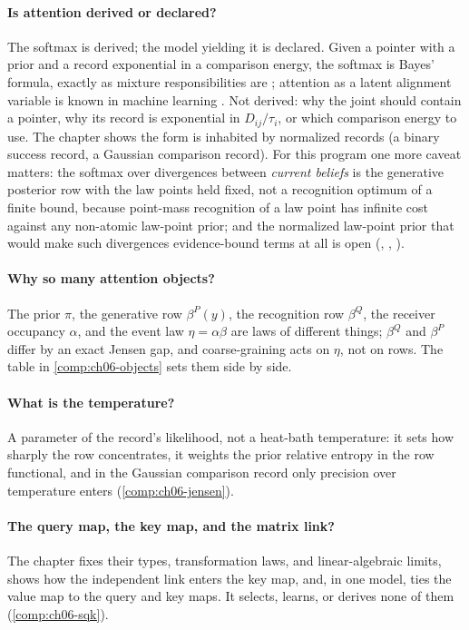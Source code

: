 \paragraph{Is attention derived or declared?}
The softmax is derived; the model yielding it is declared. Given a pointer with a prior and a record exponential
in a comparison energy, the softmax is Bayes' formula, exactly as mixture responsibilities are \citep{Bishop2006};
attention as a latent alignment variable is known in machine learning \citep{Deng2018LatentAlignment}. Not derived:
why the joint should contain a pointer, why its record is exponential in $D_{ij}/\tau_i$, or which comparison
energy to use. The chapter shows the form is inhabited by normalized records (a binary success record, a Gaussian
comparison record). For this program one more caveat matters: the softmax over divergences between \emph{current
beliefs} is the generative posterior row with the law points held fixed, not a recognition optimum of a finite
bound, because point-mass recognition of a law point has infinite cost against any non-atomic law-point prior; and
the normalized law-point prior that would make such divergences evidence-bound terms at all is open
(, , ).

\paragraph{Why so many attention objects?}
The prior $\pi$, the generative row $\beta^P(y)$, the recognition row $\beta^Q$, the receiver occupancy $\alpha$,
and the event law $\eta=\alpha\beta$ are laws of different things; $\beta^Q$ and $\beta^P$ differ by an exact Jensen
gap, and coarse-graining acts on $\eta$, not on rows. The table in \cref{comp:ch06-objects} sets them side by side.

\paragraph{What is the temperature?}
A parameter of the record's likelihood, not a heat-bath temperature: it sets how sharply the row concentrates, it
weights the prior relative entropy in the row functional, and in the Gaussian comparison record only
precision over temperature enters (\cref{comp:ch06-jensen}).

\paragraph{The query map, the key map, and the matrix link?}
The chapter fixes their types, transformation laws, and linear-algebraic limits, shows how the independent link
enters the key map, and, in one model, ties the value map to the query and key maps. It selects, learns, or derives
none of them (\cref{comp:ch06-sqk}).

